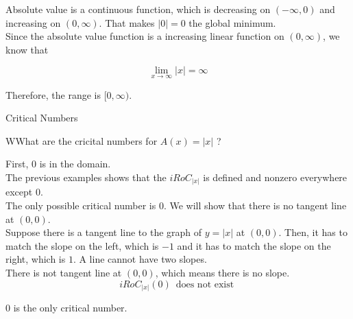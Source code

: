 \documentclass{ximera}
\begin{document}
Absolute value is a continuous function, which is decreasing on $(-\infty, 0)$ and increasing on $(0, \infty)$. That makes $| 0 | = 0$ the global minimum. \\


Since the absolute value function is a increasing linear function on $(0, \infty)$, we know that

\[
\lim\limits_{x \to \infty}| x | = \infty
\]



Therefore, the range is $[0, \infty)$.








\begin{example}  Critical Numbers


WWhat are the cricital numbers for $A(x) = | x |$ ?



\begin{explanation}


First, $0$ is in the domain. \\

The previous examples shows that the $iRoC_{|x|}$ is defined and nonzero everywhere except $0$. \\

The only possible critical number is $0$.  We will show that there is no tangent line at $(0,0)$. \\


Suppose there is a tangent line to the graph of $y = | x |$ at $(0,0)$.  Then, it has to match the slope on the left, which is $-1$ and it has to match the slope on the right, which is $1$.  A line cannot have two slopes. \\ 


There is not tangent line at $(0,0)$, which means there is no slope. \\



\[
iRoC_{|x|}(0) \, \text{ does not exist }
\]


$0$ is the only critical number.



\end{explanation}


\end{example}
\end{document}

